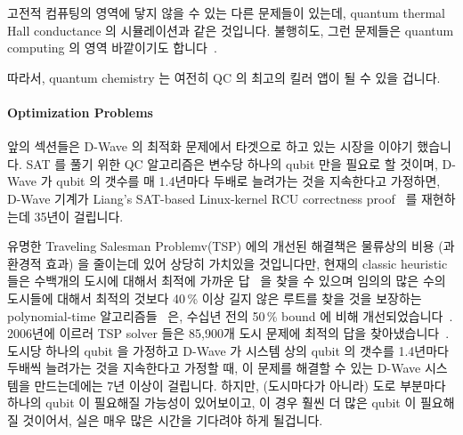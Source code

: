 고전적 컴퓨팅의 영역에 닿지 않을 수 있는 다른 문제들이 있는데, quantum thermal
Hall conductance 의 시뮬레이션과 같은 것입니다.
불행히도, 그런 문제들은 quantum computing 의 영역 바깥이기도
합니다~\cite{ZoharRingel2017QuantizedGravityHall,RichardChirwin2017ThermalHallConductance}.

따라서, quantum chemistry 는 여전히 QC 의 최고의 킬러 앱이 될 수 있을 겁니다.

\paragraph{Optimization Problems}
\label{sec:future:Optimization Problems}

앞의 섹션들은 D-Wave 의 최적화 문제에서 타겟으로 하고 있는 시장을 이야기
했습니다.
SAT 를 풀기 위한 QC 알고리즘은 변수당 하나의 qubit 만을 필요로 할 것이며,
D-Wave 가 qubit 의 갯수를 매 1.4년마다 두배로 늘려가는 것을 지속한다고
가정하면, D-Wave 기계가 Liang's SAT-based Linux-kernel RCU correctness
proof~\cite{LihaoLiang2016VerifyTreeRCU} 를 재현하는데 35년이 걸립니다.

유명한 Traveling Salesman Problemv(TSP) 에의 개선된 해결책은 물류상의 비용 (과
환경적 효과) 을 줄이는데 있어 상당히 가치있을 것입니다만, 현재의 classic
heuristic 들은 수백개의 도시에 대해서 최적에 가까운
답~\cite{Martin:1992:LMC:2307953.2308141} 을 찾을 수 있으며 임의의 많은 수의
도시들에 대해서 최적의 것보다 40\,\% 이상 길지 않은 루트를 찾을 것을 보장하는
polynomial-time 알고리즘들~\cite{Sebo:2014:STN:2688265.2688281} 은, 수십년 전의
50\,\% bound 에 비해
개선되었습니다~\cite{NicosChristofides1976TSP-FiftyPercent}.
2006년에 이르러 TSP solver 들은 85,900개 도시 문제에 최적의 답을
찾아냈습니다~\cite{DLApplegate2007TSPtextbook}.
도시당 하나의 qubit 을 가정하고 D-Wave 가 시스템 상의 qubit 의 갯수를 1.4년마다
두배씩 늘려가는 것을 지속한다고 가정할 때, 이 문제를 해결할 수 있는 D-Wave
시스템을 만드는데에는 7년 이상이 걸립니다.
하지만, (도시마다가 아니라) 도로 부분마다 하나의 qubit 이 필요해질 가능성이
있어보이고, 이 경우 훨씬 더 많은 qubit 이 필요해질 것이어서, 실은 매우 많은
시간을 기다려야 하게 될겁니다.

